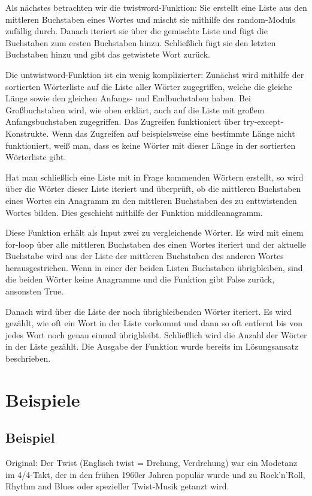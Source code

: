 \documentclass[a4paper,10pt,ngerman]{scrartcl}
\begin{document}
Als nächstes betrachten wir die twistword-Funktion:
Sie erstellt eine Liste aus den mittleren Buchstaben eines Wortes und mischt sie mithilfe des random-Moduls zufällig durch.
Danach iteriert sie über die gemischte Liste und fügt die Buchstaben zum ersten Buchstaben hinzu. 
Schließlich fügt sie den letzten Buchstaben hinzu und gibt das getwistete Wort zurück.

Die untwistword-Funktion ist ein wenig komplizierter:
Zunächst wird mithilfe der sortierten Wörterliste auf die Liste aller Wörter zugegriffen, welche die gleiche Länge sowie den gleichen Anfangs- und Endbuchstaben haben.
Bei Großbuchstaben wird, wie oben erklärt, auch auf die Liste mit großem Anfangsbuchstaben zugegriffen. 
Das Zugreifen funktioniert über try-except-Konstrukte. Wenn das Zugreifen auf beispielsweise eine bestimmte Länge nicht funktioniert, weiß man, dass es keine Wörter mit dieser Länge in der sortierten Wörterliste gibt.

Hat man schließlich eine Liste mit in Frage kommenden Wörtern erstellt, so wird über die Wörter dieser Liste iteriert und überprüft, ob die mittleren Buchstaben eines Wortes ein Anagramm zu den mittleren Buchstaben des zu enttwistenden Wortes bilden. Dies geschieht mithilfe der Funktion middleanagramm. 

Diese Funktion erhält als Input zwei zu vergleichende Wörter. Es wird mit einem for-loop über alle mittleren Buchstaben des einen Wortes iteriert und der aktuelle Buchstabe wird aus der Liste der mittleren Buchstaben des anderen Wortes herausgestrichen. Wenn in einer der beiden Listen Buchstaben übrigbleiben, sind die beiden Wörter keine Anagramme und die Funktion gibt False zurück, ansonsten True. 

Danach wird über die Liste der noch übrigbleibenden Wörter iteriert. Es wird gezählt, wie oft ein Wort in der Liste vorkommt und dann so oft entfernt bis von jedes Wort noch genau einmal übrigbleibt. Schließlich wird die Anzahl der Wörter in der Liste gezählt. Die Ausgabe der Funktion wurde bereits im Lösungsansatz beschrieben. 

\section{Beispiele}
\subsection{Beispiel}
\noindent Original: Der Twist   (Englisch twist = Drehung, Verdrehung)  war ein Modetanz im 4/4-Takt,   der in den frühen 1960er Jahren populär   wurde und zu   Rock'n'Roll, Rhythm and Blues oder spezieller  Twist-Musik getanzt wird.
\end{document}
